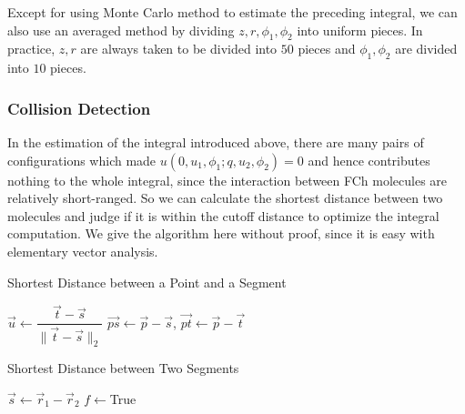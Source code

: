 Except for using Monte Carlo method to estimate the preceding integral, we can also use an averaged method by dividing $z,r,\phi_1,\phi_2$ into uniform pieces. In practice, $z,r$ are always taken to be divided into $50$ pieces and $\phi_1,\phi_2$ are divided into $10$ pieces.

\subsubsection{Collision Detection}
In the estimation of the integral introduced above, there are many pairs of configurations which made $u(0,u_1,\phi_1;q,u_2,\phi_2)=0$ and hence contributes nothing to the whole integral, since the interaction between FCh molecules are relatively short-ranged. So we can calculate the shortest distance between two molecules and judge if it is within the cutoff distance to optimize the integral computation. We give the algorithm here without proof, since it is easy with elementary vector analysis.

\begin{algorithm}[H]
	\caption{Shortest Distance between a Point and a Segment}
	\label{Alg:DisPointSeg}
	$\vec{u}\leftarrow\dfrac{\vec{t}-\vec{s}}{\|\vec{t}-\vec{s}\|_2}$\;
	$\vec{ps}\leftarrow\vec{p}-\vec{s}$, $\vec{pt}\leftarrow\vec{p}-\vec{t}$\;
\end{algorithm}

\begin{algorithm}[H]
	\caption{Shortest Distance between Two Segments}
	\label{Alg:DisSegSeg}
	$\vec{s}\leftarrow\vec{r}_1-\vec{r}_2$\;
	$f\leftarrow$True\;
	
\end{algorithm}

